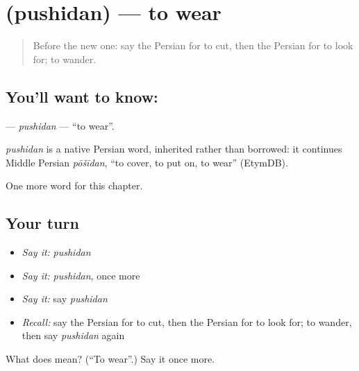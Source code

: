 \section[\texorpdfstring{\fa{پوشیدن} (pushidan)}{پوشیدن (pushidan)}]{ (pushidan) — to wear}

\label{lesson:FA-C39-pushidan}



\begin{quote}
Before the new one: say the Persian for to cut, then the Persian for to look for; to wander.
\end{quote}

\subsection*{You'll want to know: }
\textbf{} — \emph{pushidan} — \textquotedblleft{}to wear\textquotedblright{}.

\begin{cousinweb}
\emph{pushidan} is a native Persian word, inherited rather than borrowed: it continues Middle Persian \emph{pōšīdan}, \textquotedblleft{}to cover, to put on, to wear\textquotedblright{} (EtymDB).
\end{cousinweb}

\begin{grammarlens}[title={What you've built}]
One more word for this chapter.
\end{grammarlens}

\subsection*{Your turn}
\begin{itemize}
\raggedright
  \item \emph{Say it:} \emph{pushidan}
  \item \emph{Say it:} \emph{pushidan}, once more
  \item \emph{Say it:} say \emph{pushidan}
  \item \emph{Recall:} say the Persian for to cut, then the Persian for to look for; to wander, then say \emph{pushidan} again
\end{itemize}

\begin{tcolorbox}[breakable,colback=teal!4,colframe=teal!35!black,title={Before you move on}]
What does  mean? (\textquotedblleft{}To wear\textquotedblright{}.) Say it once more.
\end{tcolorbox}
